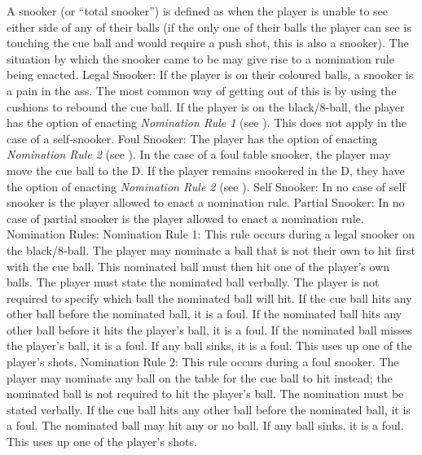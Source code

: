  A snooker (or “total snooker”) is defined as when the player is unable to see either side of any of their balls (if the only one of their balls the player can see is touching the cue ball and would require a push shot, this is also a snooker). The situation by which the snooker came to be may give rise to a nomination rule being enacted.%
 Legal Snooker:%
\subruleitem If the player is on their coloured balls, a snooker is a pain in the ass. The most common way of getting out of this is by using the cushions to rebound the cue ball.%
\subruleitem If the player is on the black/8-ball, the player has the option of enacting \emph{Nomination Rule 1} (see ). This does not apply in the case of a self-snooker.%
 Foul Snooker:%
\subruleitem The player has the option of enacting \emph{Nomination Rule 2} (see ).%
\subruleitem In the case of a foul table snooker, the player may move the cue ball to the D. If the player remains snookered in the D, they have the option of enacting \emph{Nomination Rule 2} (see ).%
 Self Snooker: In no case of self snooker is the player allowed to enact a nomination rule.%
 Partial Snooker: In no case of partial snooker is the player allowed to enact a nomination rule.%
 Nomination Rules:%
Nomination Rule 1: This rule occurs during a legal snooker on the black/8-ball. The player may nominate a ball that is not their own to hit first with the cue ball. This nominated ball must then hit one of the player's own balls. The player must state the nominated ball verbally. The player is not required to specify which ball the nominated ball will hit. If the cue ball hits any other ball before the nominated ball, it is a foul. If the nominated ball hits any other ball before it hits the player's ball, it is a foul. If the nominated ball misses the player's ball, it is a foul. If any ball sinks, it is a foul. This uses up one of the player's shots.%
Nomination Rule 2: This rule occurs during a foul snooker. The player may nominate any ball on the table for the cue ball to hit instead; the nominated ball is not required to hit the player's ball. The nomination must be stated verbally. If the cue ball hits any other ball before the nominated ball, it is a foul. The nominated ball may hit any or no ball. If any ball sinks, it is a foul. This uses up one of the player's shots.%
 {}%



